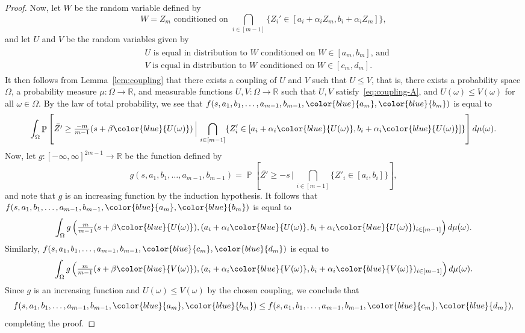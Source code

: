 \documentclass[12pt,english,reqno]{amsart}
\theoremstyle{plain}
\theoremstyle{remark}
\numberwithin{figure}{section}
\numberwithin{equation}{section}
\def\rr{\mathbb{R}}
\DeclareMathOperator{\Pb}{\mathbb{P}} %
\begin{document}
\begin{proof}
	Now, let $W$ be the random variable defined by
	\[ W = Z_m \text{ conditioned on } \bigcap_{i \in [m-1]} \{Z_i' \in [a_i+\alpha_i Z_m,b_i+\alpha_i Z_m]\},\]
	and let $U$ and $V$ be the random variables given by
	\begin{align}\label{eq:coupling-A}
		\begin{split}
			 & \text{$U$ is equal in distribution to $W$ conditioned on $W \in [a_m,b_m]$, and} \\
			 & \text{$V$ is equal in distribution to $W$ conditioned on $W \in [c_m,d_m]$.}
		\end{split}
	\end{align}
	It then follows from Lemma~\ref{lem:coupling} that there exists a coupling of $U$ and $V$ such that $U\leq V$, that is, there exists a probability space $\Omega$, a probability measure $\mu: \Omega \to \rr$, and measurable functions $U,V: \Omega \to \rr$ such that $U,V$ satisfy~\eqref{eq:coupling-A}, and  $U(\omega) \leq V(\omega)$ for all $\omega \in \Omega$. By the law of total probability, we see that $f(s,a_1,b_1,\dots, a_{m-1}, b_{m-1}, {\color{blue}{a_m}}, {\color{blue}{b_m}})$ is equal to
	\begin{align*}
		\int_{\Omega} \Pb\left[ \bar{Z'} \geq \tfrac{-m}{m-1}(s+\beta {\color{blue}{U(\omega)}}) \,\Big \vert \, \bigcap_{i \in [m-1]} \{Z_i' \in [a_i+\alpha_i {\color{blue}{U(\omega)}} ,b_i+\alpha_i {\color{blue}{U(\omega)}}] \} \right] d\mu(\omega).
	\end{align*}
	Now, let $g:[-\infty,\infty]^{2m-1}\to \rr$ be the function defined by
	\[ g(s,a_1,b_1,\dots, a_{m-1}, b_{m-1}) = \Pb\left[ \bar{Z'} \geq -s \, \Big \vert \, \bigcap_{i \in [m-1]} \{Z'_i \in [a_i,b_i]\} \right], \]
	and note that $g$ is an increasing function by the induction hypothesis. It follows that $f(s,a_1,b_1,\dots, a_{m-1}, b_{m-1}, {\color{blue}{a_m}}, {\color{blue}{b_m}})$ is equal to
	\begin{align}\label{eq:beta-1}
		\int_{\Omega}	g\left(\tfrac{m}{m-1}(s+\beta{\color{blue}{U(\omega)}}), (a_i+\alpha_i {\color{blue}{U(\omega)}} ,b_i+\alpha_i {\color{blue}{U(\omega)}})_{i \in [m-1]} \right)  d\mu(\omega).
	\end{align}
	Similarly, $f(s,a_1,b_1,\dots, a_{m-1}, b_{m-1}, {\color{blue}{c_m}}, {\color{blue}{d_m}})$ is equal to
	\begin{align}\label{eq:beta-2}
		\int_{\Omega}	g\left(\tfrac{m}{m-1}(s+\beta{\color{blue}{V(\omega)}}), (a_i+\alpha_i {\color{blue}{V(\omega)}} ,b_i+\alpha_i {\color{blue}{V(\omega)}})_{i \in [m-1]} \right) d\mu(\omega).
	\end{align}
	Since $g$ is an increasing function and $U(\omega) \leq V(\omega)$ by the chosen coupling, we conclude that
	\[ f(s,a_1,b_1,\dots, a_{m-1}, b_{m-1}, {\color{blue}{a_m}}, {\color{blue}{b_m}}) \leq f(s,a_1,b_1,\dots, a_{m-1}, b_{m-1}, {\color{blue}{c_m}}, {\color{blue}{d_m}}),\]
	completing the proof.
\end{proof}
\end{document}
